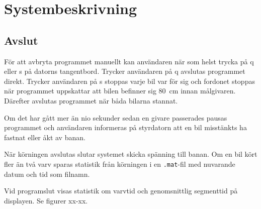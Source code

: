 \section{Systembeskrivning}






\subsection{Avslut}

För att avbryta programmet manuellt kan användaren när som helst trycka på q
eller s på datorns tangentbord. Trycker användaren på q avslutas programmet
direkt. Trycker användaren på s stoppas varje bil var för sig och fordonet stoppas när programmet uppskattar att bilen befinner sig 80~cm innan målgivaren. Därefter avslutas programmet när båda bilarna stannat.

Om det har gått mer än nio sekunder sedan en givare passerades pausas programmet
och användaren informeras på styrdatorn att en bil misstänkts ha fastnat eller
åkt av banan. 

När körningen avslutas slutar systemet skicka spänning till banan.
Om en bil kört fler än två varv sparas statistik från körningen i en
\texttt{.mat}-fil med nuvarande datum och tid som filnamn.

Vid programslut visas statistik om varvtid och genomsnittlig segmenttid på
displayen. Se figurer xx-xx.

